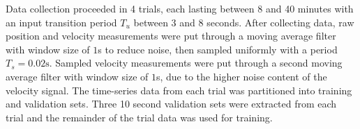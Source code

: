 
Data collection proceeded in 4 trials, each lasting between 8 and 40 minutes with an input transition period $T_u$ between 3 and 8 seconds. 
After collecting data, raw position and velocity measurements were put through a moving average filter with window size of $1$s to reduce noise, then sampled uniformly with a period $T_s = 0.02 \text{s}$.
Sampled velocity measurements were put through a second moving average filter with window size of $1$s, due to the higher noise content of the velocity signal.
The time-series data from each trial was partitioned into training and validation sets. 
Three 10 second validation sets were extracted from each trial and the remainder of the trial data was used for training.

